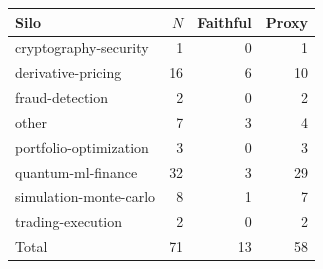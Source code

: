 \begin{tabular}{lrrr}
\toprule
Silo & $N$ & Faithful & Proxy \\
\midrule
cryptography-security & 1 & 0 & 1 \\
derivative-pricing & 16 & 6 & 10 \\
fraud-detection & 2 & 0 & 2 \\
other & 7 & 3 & 4 \\
portfolio-optimization & 3 & 0 & 3 \\
quantum-ml-finance & 32 & 3 & 29 \\
simulation-monte-carlo & 8 & 1 & 7 \\
trading-execution & 2 & 0 & 2 \\
\midrule
Total & 71 & 13 & 58 \\
\bottomrule
\end{tabular}

